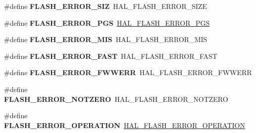 \begin{DoxyCompactItemize}
\item 
\#define {\bfseries F\+L\+A\+S\+H\+\_\+\+E\+R\+R\+O\+R\+\_\+\+S\+IZ}~H\+A\+L\+\_\+\+F\+L\+A\+S\+H\+\_\+\+E\+R\+R\+O\+R\+\_\+\+S\+I\+ZE\hypertarget{group___h_a_l___f_l_a_s_h___aliased___defines_gaaa959c347779d59952fcb60d15dbe2b0}{}\label{group___h_a_l___f_l_a_s_h___aliased___defines_gaaa959c347779d59952fcb60d15dbe2b0}

\item 
\#define {\bfseries F\+L\+A\+S\+H\+\_\+\+E\+R\+R\+O\+R\+\_\+\+P\+GS}~\hyperlink{group___f_l_a_s_h___error___code_ga7132ff3b7f45c0cfe818d61bdb01dc64}{H\+A\+L\+\_\+\+F\+L\+A\+S\+H\+\_\+\+E\+R\+R\+O\+R\+\_\+\+P\+GS}\hypertarget{group___h_a_l___f_l_a_s_h___aliased___defines_ga578b6dd558f1d11d9791b3c63a61e14b}{}\label{group___h_a_l___f_l_a_s_h___aliased___defines_ga578b6dd558f1d11d9791b3c63a61e14b}

\item 
\#define {\bfseries F\+L\+A\+S\+H\+\_\+\+E\+R\+R\+O\+R\+\_\+\+M\+IS}~H\+A\+L\+\_\+\+F\+L\+A\+S\+H\+\_\+\+E\+R\+R\+O\+R\+\_\+\+M\+IS\hypertarget{group___h_a_l___f_l_a_s_h___aliased___defines_ga10229d78c25e0d944031910606462be1}{}\label{group___h_a_l___f_l_a_s_h___aliased___defines_ga10229d78c25e0d944031910606462be1}

\item 
\#define {\bfseries F\+L\+A\+S\+H\+\_\+\+E\+R\+R\+O\+R\+\_\+\+F\+A\+ST}~H\+A\+L\+\_\+\+F\+L\+A\+S\+H\+\_\+\+E\+R\+R\+O\+R\+\_\+\+F\+A\+ST\hypertarget{group___h_a_l___f_l_a_s_h___aliased___defines_gad20c28b002e14116facba21f02b0d1ba}{}\label{group___h_a_l___f_l_a_s_h___aliased___defines_gad20c28b002e14116facba21f02b0d1ba}

\item 
\#define {\bfseries F\+L\+A\+S\+H\+\_\+\+E\+R\+R\+O\+R\+\_\+\+F\+W\+W\+E\+RR}~H\+A\+L\+\_\+\+F\+L\+A\+S\+H\+\_\+\+E\+R\+R\+O\+R\+\_\+\+F\+W\+W\+E\+RR\hypertarget{group___h_a_l___f_l_a_s_h___aliased___defines_ga9386eae0fe9e5b47720ad2378d27e743}{}\label{group___h_a_l___f_l_a_s_h___aliased___defines_ga9386eae0fe9e5b47720ad2378d27e743}

\item 
\#define {\bfseries F\+L\+A\+S\+H\+\_\+\+E\+R\+R\+O\+R\+\_\+\+N\+O\+T\+Z\+E\+RO}~H\+A\+L\+\_\+\+F\+L\+A\+S\+H\+\_\+\+E\+R\+R\+O\+R\+\_\+\+N\+O\+T\+Z\+E\+RO\hypertarget{group___h_a_l___f_l_a_s_h___aliased___defines_ga987edd2bf3a39310a655473718d9b495}{}\label{group___h_a_l___f_l_a_s_h___aliased___defines_ga987edd2bf3a39310a655473718d9b495}

\item 
\#define {\bfseries F\+L\+A\+S\+H\+\_\+\+E\+R\+R\+O\+R\+\_\+\+O\+P\+E\+R\+A\+T\+I\+ON}~\hyperlink{group___f_l_a_s_h___error___code_gafa1433e0ca2366478928c04244310d44}{H\+A\+L\+\_\+\+F\+L\+A\+S\+H\+\_\+\+E\+R\+R\+O\+R\+\_\+\+O\+P\+E\+R\+A\+T\+I\+ON}\hypertarget{group___h_a_l___f_l_a_s_h___aliased___defines_gaae29e90680573edfa4e11e07b2557f16}{}\label{group___h_a_l___f_l_a_s_h___aliased___defines_gaae29e90680573edfa4e11e07b2557f16}


\end{DoxyCompactItemize}
